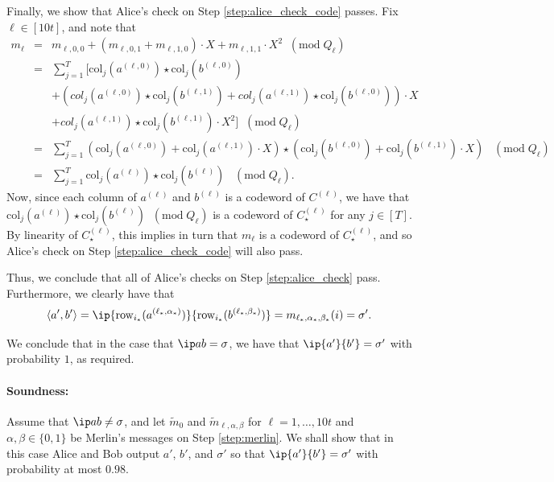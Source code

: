 \documentclass[11pt]{article}
\theoremstyle{plain}
\theoremstyle{remark}
\newcommand{\row}{\mathrm{row}}
\newcommand{\col}{\mathrm{col}}
\begin{document}
Finally, we show that Alice's check on Step \ref{step:alice_check_code} passes. Fix $\ell \in [10 t]$, and note that
\begin{eqnarray}\label{eq:complete_4}
\nonumber
m_\ell & =&  m_{\ell,0,0}   + ( m_{\ell,0,1}   + m_{\ell,1,0} ) \cdot X +  m_{\ell,1,1}   \cdot X^2   \;\;(\mathrm{mod} \;Q_\ell) \\ \nonumber
& = & \sum_{j=1}^T \bigg[ \col_{j}(a^{(\ell,0)}) \star \col_j(b^{(\ell,0)}) \\ \nonumber
&&  +  \left( col_{j}(a^{(\ell,0)}) \star \col_j(b^{(\ell,1)}) +col_{j}(a^{(\ell,1)}) \star \col_j(b^{(\ell,0)})  \right) \cdot X   \\  \nonumber
&& +  col_{j}(a^{(\ell,1)}) \star \col_j(b^{(\ell,1)})    \cdot X^2 \bigg]  \;\;(\mathrm{mod} \;Q_\ell)
 \\ \nonumber
&= &\sum_{j=1}^T ( \col_{j} (a^{(\ell,0)}) + \col_{j} (a^{(\ell,1)})\cdot X)\star ( \col_{j} (b^{(\ell,0)}) + \col_{j} (b^{(\ell,1)})\cdot X) \;\;\;(\mathrm{mod} \;Q_\ell)\\
&= &\sum_{j=1}^T \col_{j}(a^{(\ell)}) \star \col_j(b^{(\ell)})  \;\;\;(\mathrm{mod} \;Q_\ell).
\end{eqnarray}
Now, since each column of $a^{(\ell)}$ and $b^{(\ell)}$ is a codeword of $C^{(\ell)}$, we have that $\col_{j}(a^{(\ell)}) \star \col_j(b^{(\ell)}) \;\;(\mathrm{mod} \;Q_\ell)$ is a codeword of $C_\star^{(\ell)}$ for any $j \in [T]$. By linearity 
of $C_\star^{(\ell)}$, this implies in turn that $m_\ell$ is a codeword of $C_\star^{(\ell)}$, 
and so Alice's check on Step \ref{step:alice_check_code} will also pass.

Thus, we conclude that all of Alice's checks on Step \ref{step:alice_check} pass.
Furthermore, we clearly have that 
$$\langle  a', b' \rangle  =\ip {\row_{i_*}(a^{(\ell_*,\alpha_*)})} {\row_{i_*}(b^{({\ell_*},\beta_*)})} = m_{\ell_*,\alpha_*, \beta_*} (i) = \sigma'.$$

We conclude that in the case that $\ip a b = \sigma$, we have that $\ip {a'} {b'} = \sigma'$ with probability $1$, as required.

\paragraph{Soundness:}
Assume that $\ip a b \neq \sigma$, and let  $\tilde m_0$ and $\tilde m_{\ell,\alpha, \beta}$ for $\ell=1, \ldots, 10 t$ and $\alpha, \beta \in \{0,1\}$ be Merlin's messages on Step \ref{step:merlin}. We shall show that in this case Alice and Bob output $a'$, $b'$, and $\sigma'$ so that $\ip {a'} {b'} = \sigma'$ with probability at most $0.98$.
\end{document}

